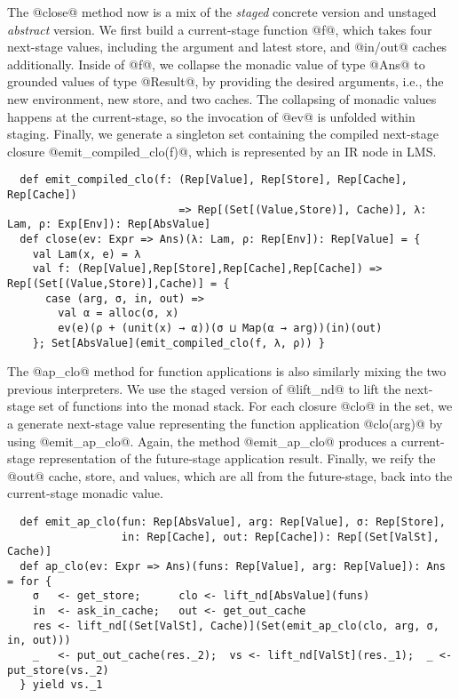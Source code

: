 The @close@ method now is a mix of the \textit{staged} concrete version and
unstaged \textit{abstract} version. We first build a current-stage function @f@, which
takes four next-stage values, including the argument and latest store, and
@in/out@ caches additionally. Inside of @f@, we collapse the monadic value of
type @Ans@ to grounded values of type @Result@, by providing the desired
arguments, i.e., the new environment, new store, and two caches. The collapsing
of monadic values happens at the current-stage, so the invocation of @ev@ is unfolded
within staging. Finally, we generate a singleton set containing the compiled
next-stage closure @emit_compiled_clo(f)@, which is represented by an IR node
in LMS.
\begin{lstlisting}
  def emit_compiled_clo(f: (Rep[Value], Rep[Store], Rep[Cache], Rep[Cache])
                           => Rep[(Set[(Value,Store)], Cache)], λ: Lam, ρ: Exp[Env]): Rep[AbsValue]
  def close(ev: Expr => Ans)(λ: Lam, ρ: Rep[Env]): Rep[Value] = {
    val Lam(x, e) = λ
    val f: (Rep[Value],Rep[Store],Rep[Cache],Rep[Cache]) => Rep[(Set[(Value,Store)],Cache)] = {
      case (arg, σ, in, out) =>
        val α = alloc(σ, x)
        ev(e)(ρ + (unit(x) → α))(σ ⊔ Map(α → arg))(in)(out)
    }; Set[AbsValue](emit_compiled_clo(f, λ, ρ)) }
\end{lstlisting}

The @ap_clo@ method for function applications is also similarly mixing the two
previous interpreters.  We use the staged version of @lift_nd@ to lift the
next-stage set of functions into the monad stack.
For each closure @clo@ in the set, we a generate next-stage value representing
the function application @clo(arg)@ by using @emit_ap_clo@.  Again, the method
@emit_ap_clo@ produces a current-stage representation of the future-stage
application result.  Finally, we reify the @out@ cache, store, and values,
which are all from the future-stage, back into the current-stage monadic value.
\begin{lstlisting}
  def emit_ap_clo(fun: Rep[AbsValue], arg: Rep[Value], σ: Rep[Store],
                  in: Rep[Cache], out: Rep[Cache]): Rep[(Set[ValSt], Cache)]
  def ap_clo(ev: Expr => Ans)(funs: Rep[Value], arg: Rep[Value]): Ans = for {
    σ   <- get_store;      clo <- lift_nd[AbsValue](funs)
    in  <- ask_in_cache;   out <- get_out_cache
    res <- lift_nd[(Set[ValSt], Cache)](Set(emit_ap_clo(clo, arg, σ, in, out)))
    _   <- put_out_cache(res._2);  vs <- lift_nd[ValSt](res._1);  _ <- put_store(vs._2)
  } yield vs._1
\end{lstlisting}

